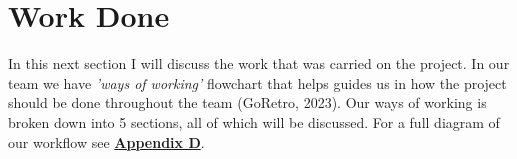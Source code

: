\section{Work Done}
  In this next section I will discuss the work that was carried on the project. In our team we have \textit{'ways of working'}
  flowchart that helps guides us in how the project should be done throughout the team (GoRetro, 2023). Our ways of working is broken down into 5 sections, 
  all of which will be discussed. For a full diagram of our workflow see \hyperref[sec:AppendixD]{\textbf{Appendix D}}.

  
  
  
  
  

  \newpage
  
  